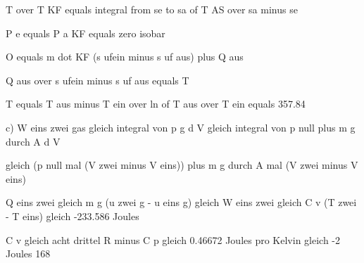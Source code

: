 T over T KF equals integral from se to sa of T AS over sa minus se

P e equals P a KF equals zero isobar

O equals m dot KF (s ufein minus s uf aus) plus Q aus

Q aus over s ufein minus s uf aus equals T

T equals T aus minus T ein over ln of T aus over T ein equals 357.84

c) W eins zwei gas gleich integral von p g d V gleich integral von p null plus m g durch A d V

gleich (p null mal (V zwei minus V eins)) plus m g durch A mal (V zwei minus V eins)

Q eins zwei gleich m g (u zwei g - u eins g) gleich W eins zwei gleich C v (T zwei - T eins) gleich -233.586 Joules

C v gleich acht drittel R minus C p gleich 0.46672 Joules pro Kelvin gleich -2 Joules 168